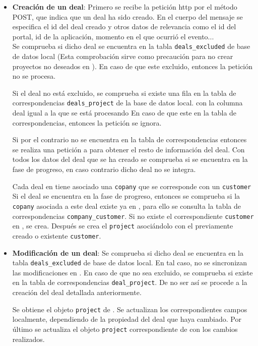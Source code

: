 \begin{itemize}
	\item \textbf{Creación de un deal}: Primero se recibe la petición \acrshort{http} por el método POST, que indica que un deal ha sido creado. En el cuerpo del mensaje se especifica el id del deal creado y otros datos de relevancia como el id del portal, id de la aplicación, momento en el que ocurrió el evento... \\
	
		Se comprueba si dicho deal se encuentra en la tabla \verb|deals_excluded| de base de datos local (Esta comprobación sirve como precaución para no crear proyectos no deseados en \wday{}).
		En caso de que este excluido, entonces la petición no se procesa.
		
		Si el deal no está excluido, se comprueba si existe una fila en la tabla de correspondencias \verb|deals_project| de la base de datos local.
		con la columna deal igual a la que se está procesando %
		En caso de que este en la tabla de correspondencias, entonces la petición se ignora.

		Si por el contrario no se encuentra en la tabla de correspondencias entonces se realiza una petición a \hs{} para obtener el resto de información del deal.
		Con todos los datos del deal que se ha creado se comprueba si se encuentra en la fase de progreso, en caso contrario dicho deal no se integra.
		
		
		
		Cada deal en \hs{} tiene asociado una \verb|copany| que se corresponde con un \verb|customer|
		Si el deal se encuentra en la fase de progreso, entonces se comprueba si la \verb|copany| asociada a este deal existe ya en \wday{}, para ello se consulta la tabla de correspondencias \verb|company_customer|. Si no existe el correspondiente \verb|customer| en \wday{}, se crea.
		Después se crea el \verb|project| asociándolo con el previamente creado o existente \verb|customer|.
		
		
		
		
		
	\item \textbf{Modificación de un deal}:
		Se comprueba si dicho deal se encuentra en la tabla \verb|deals_excluded| de base de datos local. En tal caso, no se sincronizan las modificaciones en \wday.
		En caso de que no sea excluido, se comprueba si existe en la tabla de correspondencias \verb|deal_project|. De no ser así se procede a la creación del deal detallada anteriormente.
		
		
		
		Se obtiene el objeto \verb|project| de \wday. Se actualizan los correspondientes campos localmente, dependiendo de la propiedad del deal que haya cambiado. Por último se actualiza el objeto \verb|project| correspondiente de \wday{} con los cambios realizados.
		
		
		

\end{itemize}



